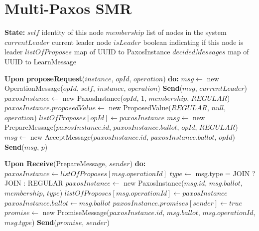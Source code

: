 \documentclass[10pt,a4paper,twocolumn]{article}
\begin{document}
\onecolumn
\section{Multi-Paxos SMR}
\label{code:MPSMR}

\begin{algorithm}
\caption{Multi-Paxos Agreement Protocol}
\begin{algorithmic}
\State \textbf{State:}
\State \hspace{1em} $self$ {identity of this node}
\State \hspace{1em} $membership$ {list of nodes in the system}
\State \hspace{1em} $currentLeader$ {current leader node}
\State \hspace{1em} $isLeader$ {boolean indicating if this node is leader}
\State \hspace{1em} $listOfProposes$ {map of UUID to PaxosInstance}
\State \hspace{1em} $decidedMessages$ {map of UUID to LearnMessage}
\State

\State \textbf{Upon proposeRequest}($instance$, $opId$, $operation$) \textbf{do:}
\State \Return
\EndIf
{}
\State $msg \leftarrow$ new OperationMessage($opId$, $self$, $instance$, $operation$)
\State \textbf{Send}($msg$, $currentLeader$)
\State \Return
\EndIf
\State $paxosInstance \leftarrow$ new PaxosInstance($opId$, $1$, $membership$, $REGULAR$)
\State $paxosInstance.proposedValue \leftarrow$ new ProposedValue($REGULAR$, $null$, $operation$)
\State $listOfProposes[opId] \leftarrow paxosInstance$
  
\State $msg \leftarrow$ new PrepareMessage($paxosInstance.id$, $paxosInstance.ballot$, $opId$, $REGULAR$)
\Else {}
\State $msg \leftarrow$ new AcceptMessage($paxosInstance.id$, $paxosInstance.ballot$, $opId$)
\EndIf
{}
\State \textbf{Send}($msg$, $p$)
\EndFor
\State

\State \textbf{Upon Receive}(PrepareMessage, $sender$) \textbf{do:}
\State $paxosInstance \leftarrow listOfProposes[msg.operationId]$
\State $type \leftarrow$ msg.type = JOIN ? JOIN : REGULAR
\State $paxosInstance \leftarrow$ new PaxosInstance($msg.id$, $msg.ballot$, $membership$, $type$)
\State $listOfProposes[msg.operationId] \leftarrow paxosInstance$
\EndIf
{}
\State $paxosInstance.ballot \leftarrow msg.ballot$
\State $paxosInstance.promises[sender] \leftarrow true$
\State $promise \leftarrow$ new PromiseMessage($paxosInstance.id$, $msg.ballot$, $msg.operationId$, $msg.type$)
\State \textbf{Send}($promise$, $sender$)
\EndIf
\State


\end{algorithmic}
\end{algorithm}
\end{document}

